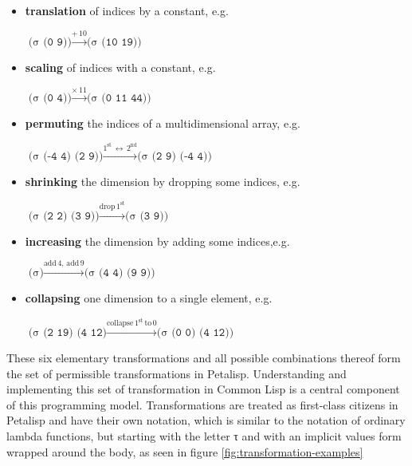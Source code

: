 \begin{itemize}
\item \textbf{translation} of indices by a constant, e.g.
  \begin{flushleft}
    $\texttt{(σ (0 9))} \xrightarrow{+\,10} \texttt{(σ (10 19))}$
  \end{flushleft}
\item \textbf{scaling} of indices with a constant, e.g.
  \begin{flushleft}
    $\texttt{(σ (0 4))} \xrightarrow{\times\, 11} \texttt{(σ (0 11 44))}$
  \end{flushleft}
\item \textbf{permuting} the indices of a multidimensional array, e.g.
  \begin{flushleft}
    $\texttt{(σ (-4 4) (2 9))}
    \xrightarrow{1^{\text{st}} \,\leftrightarrow\, 2^{\text{nd}}}
    \texttt{(σ (2 9) (-4 4))}$
  \end{flushleft}
\item \textbf{shrinking} the dimension by dropping some indices, e.g.
  \begin{flushleft}
    $\texttt{(σ (2 2) (3 9))}
    \xrightarrow{\text{drop}\, 1^{\text{st}}}
    \texttt{(σ (3 9))}$
  \end{flushleft}
\item \textbf{increasing} the dimension by adding some indices,e.g.
  \begin{flushleft}
    $\texttt{(σ)}
    \xrightarrow{\text{add}\, 4,\, \text{add}\, 9}
    \texttt{(σ (4 4) (9 9))}$
  \end{flushleft}
\item \textbf{collapsing} one dimension to a single element, e.g.
  \begin{flushleft}
    $\texttt{(σ (2 19) (4 12)}
    \xrightarrow{\text{collapse}\, 1^{\text{st}}\, \text{to}\, 0}
    \texttt{(σ (0 0) (4 12))}$
  \end{flushleft}
\end{itemize}

These six elementary transformations and all possible combinations thereof
form the set of permissible transformations in Petalisp. Understanding and
implementing this set of transformation in Common Lisp is a central
component of this programming model. Transformations are treated as
first-class citizens in Petalisp and have their own notation, which is
similar to the notation of ordinary lambda functions, but starting with the
letter τ and with an implicit values form wrapped around the body, as seen
in figure \ref{fig:transformation-examples}

